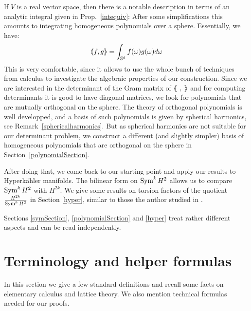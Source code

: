 If $V$ is a real vector space, then there is a notable description in terms of an analytic integral given in Prop.~\ref{intequiv}: After some simplifications this amounts to integrating homogeneous polynomials over a sphere. Essentially, we have:
$$ \left<\!\!\!\:\left< f,g\right>\!\!\!\:\right> = \int_{\mathbb{S}^d} f(\omega)g(\omega)d\omega $$
This is very comfortable, since it allows to use the whole bunch of techniques from calculus to investigate the algebraic properties of our construction.
Since we are interested in the determinant of the Gram matrix of $\bra\ ,\;\ket$
and for computing determinants it is good to have diagonal matrices, we look for polynomials that are mutually orthogonal on the sphere. The theory of orthogonal polynomials is well developped, and a basis of such polynomials is given by spherical harmonics, see Remark~\ref{sphericalharmonics}. But as spherical harmonics are not suitable for our determinant problem, we construct a different (and slightly simpler)
basis of homogeneous polynomials that are orthogonal on the sphere in Section~\ref{polynomialSection}.

After doing that, we come back to our starting point and apply our results to Hyperk\"ahler manifolds. The bilinear form on $\operatorname{Sym}^kH^2$ allows us to compare $\operatorname{Sym}^kH^2$ with $H^{2k}$. We give some results on torsion factors of the quotient $\frac{H^{2k}}{\operatorname{Sym}^kH^2}$ in Section \ref{hyper}, similar to those the author studied in \cite{Kapfer}.

Sections \ref{symSection}, \ref{polynomialSection} and \ref{hyper} treat rather different aspects and can be read independently.



\section{Terminology and helper formulas} \label{boring}
In this section 
we give a few standard definitions and recall some facts on elementary calculus and lattice theory. We also mention technical formulas needed for our proofs.
